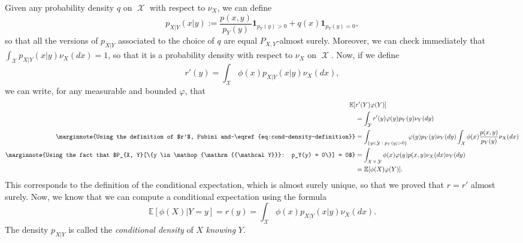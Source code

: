\documentclass[
	fontsize=11pt, %
	twoside=false, %
	numbers=noenddot, %
]{kaobook}
\DeclareMathOperator{\cX}{{\mathcal X}}
\DeclareMathOperator{\cY}{{\mathcal Y}}
\renewcommand{\P}{\mathbb P}
\newcommand{\E}{\mathbb E}
\newcommand{\ind}[1]{\mathbf 1_{#1}}
\begin{document}
Given any probability density $q$ on $\cX$ with respect to $\nu_X$, we can define
\begin{equation}
	\label{eq:cond-density-definition}
	p_{X | Y}(x | y) := \frac{p(x, y)}{p_Y(y)} \ind{p_Y(y) > 0} + q(x) \ind{p_Y(y) = 0},
\end{equation}
so that all the versions of $p_{X | Y}$ associated to the choice of $q$ are equal $P_{X, Y}$-almost surely.
Moreover, we can check immediately that $\int_{\cX} p_{X | Y}(x | y) \nu_X(dx) = 1$, so that it is a probability density with respect to $\nu_X$ on $\cX$.
Now, if we define
\begin{equation*}
	r'(y) = \int_{\cX} \phi(x) p_{X | Y}(x | y) \nu_X(dx),
\end{equation*}
we can write, for any measurable and bounded $\varphi$, that
\begin{align*}
	\E[ &r'(Y) \varphi(Y)] \\
	&= \int_{\cY} r'(y) \varphi(y) p_Y(y) \nu_Y(dy) \\
	\marginnote{Using the definition of $r'$, Fubini and~\eqref{eq:cond-density-definition}}
	&= \int_{\{ y \in \cY \;:\; p_Y(y) > 0 \}} \varphi(y) p_Y(y) \nu_Y(dy) 
	\int_{\cX} \phi(x) \frac{p(x, y)}{p_Y(y)} \nu_X(dx) \\
	\marginnote{Using the fact that $P_{X, Y}[\{y \in \cY : p_Y(y) = 0\}] = 0$}
	&= \int_{\cX \times \cY} \phi(x) \varphi(y) p(x, y) \nu_X(dx) \nu_Y(dy) \\
	&= \E[ \phi(X) \varphi(Y)].
\end{align*}
This corresponds to the definition of the conditional expectation, which is almost surely unique, so that we proved that $r = r'$ almost surely.
Now, we know that we can compute a conditional expectation using the formula
\begin{equation*}
	\E[\phi(X) | Y = y] = r(y) = \int_{\cX} \phi(x) p_{X | Y}(x | y) \nu_X(dx).
\end{equation*}
The density $p_{X | Y}$ is called the \emph{conditional density} of $X$ \emph{knowing} $Y$.

\end{document}
